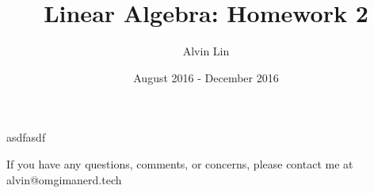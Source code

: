 \documentclass[letterpaper, 12pt]{math}
\title{Linear Algebra: Homework 2}
\author{Alvin Lin}
\date{August 2016 - December 2016}
\begin{document}
\maketitle


asdfasdf


\begin{center}
  If you have any questions, comments, or concerns, please contact me at
  alvin@omgimanerd.tech
\end{center}
\end{document}
